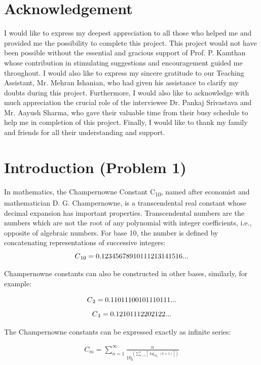 \documentclass[paper=a4, fontsize=11pt]{report}
\numberwithin{equation}{section}		%
\numberwithin{figure}{section}			%
\numberwithin{table}{section}				%
\begin{document}
\chapter{Acknowledgement}
I would like to express my deepest appreciation to all those who helped me and provided me the possibility to complete this project.
\vskip1mm
This project would not have been possible without the essential and gracious support of Prof. P. Kamthan whose contribution in stimulating suggestions and encouragement guided me throughout.
\vskip1mm
I would also like to express my sincere gratitude to our Teaching Assistant, Mr. Mehran Ishanian, who had given his assistance to clarify my doubts during this project.
\vskip1mm
Furthermore, I would also like to acknowledge with much appreciation the crucial role of the interviewee Dr. Pankaj Srivastava and Mr. Aayush Sharma, who gave their valuable time from their busy schedule to help me in completion of this project. 
\vskip1mm
Finally, I would like to thank my family and friends for all their understanding and support. 



\chapter{Introduction (Problem 1)}
In mathematics, the Champernowne Constant C\textsubscript{10}, named after economist and mathematician D. G. Champernowne, is a transcendental real constant whose decimal expansion has important properties.\newline
Transcendental numbers are the numbers which are not the root of any polynomial with integer coefficients, i.e., opposite of algebraic numbers.\newline
For base 10, the number is defined by concatenating representations of successive integers:
\[ C\textsubscript{10} = 0.12345678910111213141516... \]  
\begin{flushleft}
Champernowne constants can also be constructed in other bases, similarly, for example:
\end{flushleft}

\[ C\textsubscript{2} = 0.11011100101110111... \]
\[ C\textsubscript{3} = 0.12101112202122... \]

\begin{flushleft}
The Champernowne constants can be expressed exactly as infinite series:
\end{flushleft}

\begin{align*}
{\displaystyle C_{m}=\sum _{n=1}^{\infty }{\frac {n}{10_{b}^{~\left(\sum \limits _{k=1}^{n}\left\lceil \log _{10_{b}}(k+1)\right\rceil \right)}}}}
\end{align*}
\end{document}
